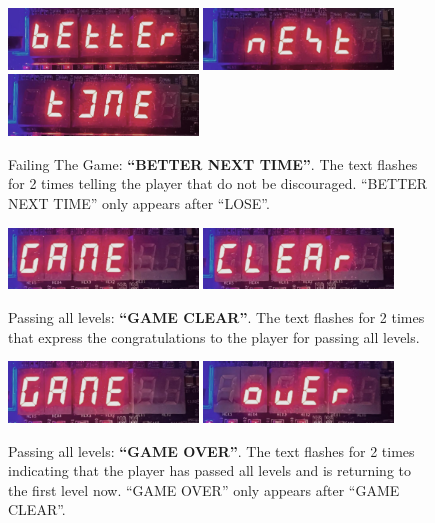 \documentclass[conference]{IEEEtran}
\begin{document}
\begin{figure}[h] %
    \centering
    \includegraphics[width=0.45\textwidth]{imageset/better}
    \includegraphics[width=0.45\textwidth]{imageset/next}
    \includegraphics[width=0.45\textwidth]{imageset/time}
    \caption{Failing The Game: \textbf{``BETTER NEXT TIME''}. The text flashes for 2 times telling the player that do not be discouraged. ``BETTER NEXT TIME'' only appears after ``LOSE''.}
    \label{fig_fail}
\end{figure}

\begin{figure}[h] %
    \centering
    \includegraphics[width=0.45\textwidth]{imageset/game1}
    \includegraphics[width=0.45\textwidth]{imageset/clear}
    \caption{Passing all levels: \textbf{``GAME CLEAR''}. The text flashes for 2 times that express the congratulations to the player for passing all levels.}
    \label{fig_game_clear}
\end{figure}

\begin{figure}[h] %
    \centering
    \includegraphics[width=0.45\textwidth]{imageset/game2}
    \includegraphics[width=0.45\textwidth]{imageset/over}
    \caption{Passing all levels: \textbf{``GAME OVER''}. The text flashes for 2 times indicating that the player has passed all levels and is returning to the first level now. ``GAME OVER'' only appears after ``GAME CLEAR''.}
    \label{fig_game_over}
\end{figure}
\end{document}
